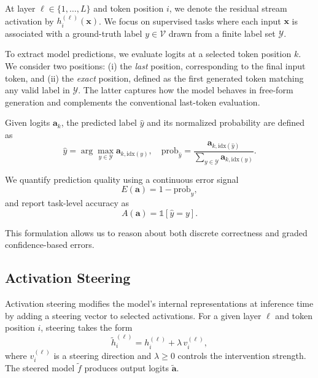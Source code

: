 \documentclass[sigconf]{acmart}
\begin{document}
At layer $\ell \in \{1,\dots,L\}$ and token position $i$, we denote the residual stream activation by $h_i^{(\ell)}(\mathbf{x})$. We focus on supervised tasks where each input $\mathbf{x}$ is associated with a ground-truth label $y \in \mathcal{V}$ drawn from a finite label set $\mathcal{Y}$.

To extract model predictions, we evaluate logits at a selected token position $k$. We consider two positions: (i) the \emph{last} position, corresponding to the final input token, and (ii) the \emph{exact} position, defined as the first generated token matching any valid label in $\mathcal{Y}$. The latter captures how the model behaves in free-form generation and complements the conventional last-token evaluation.

Given logits $\mathbf{a}_{k}$, the predicted label $\hat{y}$ and its normalized probability are defined as
\begin{equation}
\hat{y} = \arg\max_{y \in \mathcal{Y}} \mathbf{a}_{k,\mathrm{idx}(y)}, \quad
\mathrm{prob}_{\hat{y}} =
\frac{\mathbf{a}_{k,\mathrm{idx}(\hat{y})}}{\sum_{y \in \mathcal{Y}} \mathbf{a}_{k,\mathrm{idx}(y)}}.
\end{equation}

We quantify prediction quality using a continuous error signal
\begin{equation}
E(\mathbf{a}) = 1 - \mathrm{prob}_{y},
\end{equation}
and report task-level accuracy as
\begin{equation}
A(\mathbf{a}) = \mathds{1}[\hat{y} = y].
\end{equation}

This formulation allows us to reason about both discrete correctness and graded confidence-based errors.

\subsection{Activation Steering}

Activation steering modifies the model’s internal representations at inference time by adding a steering vector to selected activations. For a given layer $\ell$ and token position $i$, steering takes the form
\begin{equation}
\tilde{h}_i^{(\ell)} = h_i^{(\ell)} + \lambda\, v_i^{(\ell)},
\end{equation}
where $v_i^{(\ell)}$ is a steering direction and $\lambda \ge 0$ controls the intervention strength. The steered model $\tilde{f}$ produces output logits $\tilde{\mathbf{a}}$.
\end{document}

